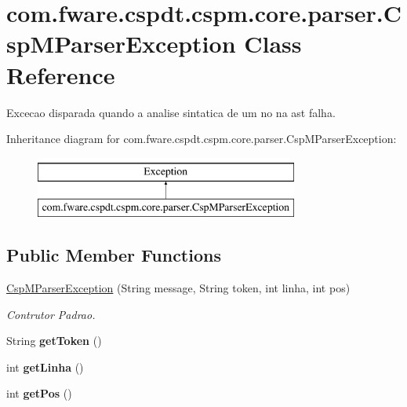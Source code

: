 \hypertarget{classcom_1_1fware_1_1cspdt_1_1cspm_1_1core_1_1parser_1_1_csp_m_parser_exception}{}\section{com.\+fware.\+cspdt.\+cspm.\+core.\+parser.\+Csp\+M\+Parser\+Exception Class Reference}
\label{classcom_1_1fware_1_1cspdt_1_1cspm_1_1core_1_1parser_1_1_csp_m_parser_exception}


Excecao disparada quando a analise sintatica de um no na ast falha.  


Inheritance diagram for com.\+fware.\+cspdt.\+cspm.\+core.\+parser.\+Csp\+M\+Parser\+Exception\+:\begin{figure}[H]
\begin{center}
\leavevmode
\includegraphics[height=2.000000cm]{classcom_1_1fware_1_1cspdt_1_1cspm_1_1core_1_1parser_1_1_csp_m_parser_exception}
\end{center}
\end{figure}
\subsection*{Public Member Functions}
\begin{DoxyCompactItemize}
\item 
\hyperlink{classcom_1_1fware_1_1cspdt_1_1cspm_1_1core_1_1parser_1_1_csp_m_parser_exception_af682de9d6863741515bd16984a49cba6}{Csp\+M\+Parser\+Exception} (String message, String token, int linha, int pos)
\begin{DoxyCompactList}\small\item\em Contrutor Padrao. \end{DoxyCompactList}\item 
\mbox{\label{classcom_1_1fware_1_1cspdt_1_1cspm_1_1core_1_1parser_1_1_csp_m_parser_exception_af88518474b589e8fae93da03509406a6}} 
String {\bfseries get\+Token} ()
\item 
\mbox{\label{classcom_1_1fware_1_1cspdt_1_1cspm_1_1core_1_1parser_1_1_csp_m_parser_exception_ab74d0acba740b8401cbe5accd59a408c}} 
int {\bfseries get\+Linha} ()
\item 
\mbox{\label{classcom_1_1fware_1_1cspdt_1_1cspm_1_1core_1_1parser_1_1_csp_m_parser_exception_aa253986d49dda0f6bdd1a6e2646ec1ac}} 
int {\bfseries get\+Pos} ()
\end{DoxyCompactItemize}


